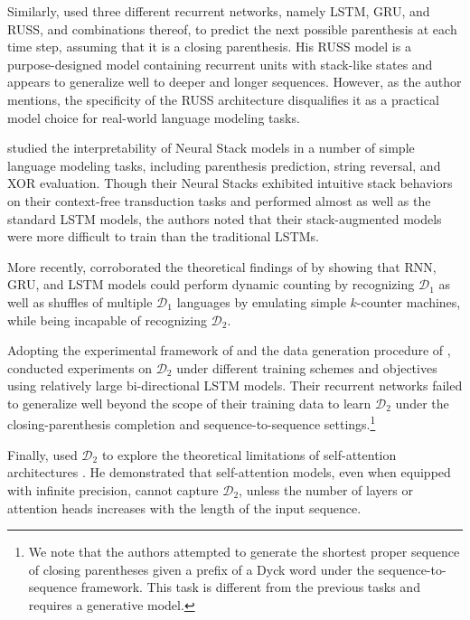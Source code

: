 \documentclass[11pt,a4paper]{article}
\theoremstyle{plain}
\newcommand{\dyck}[1]{\ensuremath{\mathcal{D}_{#1}}}
\begin{document}
Similarly, \citet{bernardy2018can} used three different recurrent networks, namely LSTM, GRU, and RUSS, and combinations thereof, to predict the next possible parenthesis at each time step, assuming that it is a closing parenthesis.
His RUSS model is a purpose-designed model containing recurrent units with stack-like states and appears to generalize well to deeper and longer sequences. However, as the author mentions, the specificity of the RUSS architecture disqualifies it as a practical model choice for real-world language modeling tasks.

\citet{hao2018context} studied the interpretability of Neural Stack models \citep{grefenstette2015learning} in a number of simple language modeling tasks, including parenthesis prediction, string reversal, and XOR evaluation. Though their Neural Stacks exhibited intuitive stack behaviors on their context-free transduction tasks and performed almost as well as the standard LSTM models, the authors noted that their stack-augmented models were more difficult to train than the traditional LSTMs.

More recently, \citet{suzgun-etal-2019-lstm} corroborated the theoretical findings of \citet{weiss2018practical} by showing that  RNN, GRU, and LSTM models could perform dynamic counting by recognizing \dyck{1} as well as shuffles of multiple \dyck{1} languages by emulating simple $k$-counter machines, while being incapable of recognizing \dyck{2}.

Adopting the experimental framework of \citet{sennhauser2018evaluating} and the data generation procedure of \citet{skachkova2018closing}, \citet{yu-etal-2019-learning} conducted experiments on \dyck{2} under different training schemes and objectives using relatively large bi-directional LSTM models. Their recurrent networks failed to generalize well beyond the scope of their training data to learn \dyck{2} under the closing-parenthesis completion and sequence-to-sequence settings.\footnote{We note that the authors attempted to generate the shortest proper sequence of closing parentheses given a prefix of a Dyck word under the sequence-to-sequence framework. This task is different from the previous tasks and requires a generative model.}

Finally, \citet{hahn2019theoretical} used \dyck{2} to explore the theoretical limitations of self-attention architectures \citep{vaswani2017attention}. He demonstrated that self-attention models, even when equipped with infinite precision, cannot capture \dyck{2}, unless the number of layers or attention heads increases with the length of the input sequence.
\end{document}
